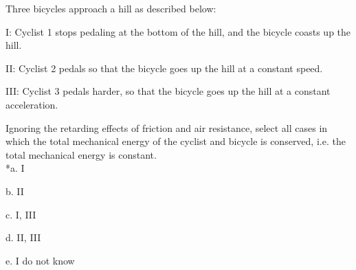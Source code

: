 
Three bicycles approach a hill as described below:

I: Cyclist 1 stops pedaling at the bottom of the hill, and the bicycle coasts up the hill.

II: Cyclist 2 pedals so that the bicycle goes up the hill at a constant speed.

III: Cyclist 3 pedals harder, so that the bicycle goes up the hill at a constant acceleration.

Ignoring the retarding effects of friction and air resistance, select all cases in which the total mechanical energy of the cyclist and bicycle is conserved, i.e. the total mechanical energy is constant. \\

*a. I

b. II

c. I, III

d. II, III

e. I do not know \\
